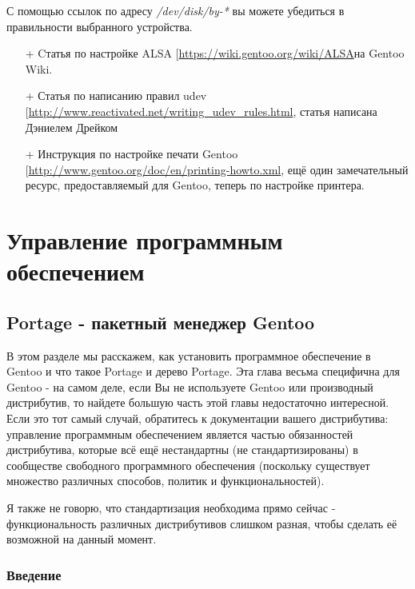 \documentclass[10pt]{book}
\begin{document}
С помощью ссылок по адресу \textit{/dev/disk/by-*} вы можете убедиться в правильности выбранного устройства.

\newpage

\phantom{}
\begin{tcolorbox}[title=\textbf{Дальнейшие ресурсы}, colback=yellow!14!white, colframe=red!75!blue]
\begin{itemize}
	\item[+] Cтатья по настройке ALSA [\url{https://wiki.gentoo.org/wiki/ALSA}на Gentoo Wiki.
	\item[+] Статья по написанию правил udev [\url{http://www.reactivated.net/writing_udev_rules.html}, статья написана Дэниелем Дрейком
	\item[+] Инструкция по настройке печати Gentoo [\url{http://www.gentoo.org/doc/en/printing-howto.xml}, ещё один замечательный ресурс, предоставляемый для Gentoo, теперь по настройке принтера.
\end{itemize}
\end{tcolorbox}

\newpage

\chapter{Управление программным обеспечением}

\section*{Portage - пакетный менеджер Gentoo}

В этом разделе мы расскажем, как установить программное обеспечение в Gentoo и что такое Portage и дерево Portage. Эта глава весьма специфична для Gentoo - на самом деле, если Вы не используете Gentoo или производный дистрибутив, то найдете большую часть этой главы недостаточно интересной. Если это тот самый случай, обратитесь к документации вашего дистрибутива: управление программным обеспечением является частью  обязанностей дистрибутива, которые всё ещё нестандартны (не стандартизированы) в сообществе свободного программного обеспечения (поскольку существует множество различных способов, политик и функциональностей).

Я также не говорю, что стандартизация необходима прямо сейчас - функциональность различных дистрибутивов слишком разная, чтобы сделать её возможной на данный момент.

\subsection{Введение}
\end{document}

